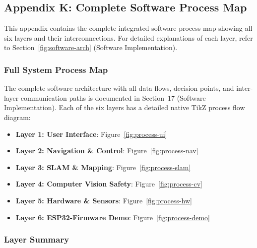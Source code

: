 
\newpage
\subsection{Appendix K: Complete Software Process Map}
\label{app:software-process-full}

This appendix contains the complete integrated software process map showing all six layers and their interconnections. For detailed explanations of each layer, refer to Section~\ref{fig:software-arch} (Software Implementation).

\subsubsection{Full System Process Map}

The complete software architecture with all data flows, decision points, and inter-layer communication paths is documented in Section~17 (Software Implementation). Each of the six layers has a detailed native TikZ process flow diagram:

\begin{itemize}[nosep]
    \item \textbf{Layer 1: User Interface}: Figure~\ref{fig:process-ui}
    \item \textbf{Layer 2: Navigation \& Control}: Figure~\ref{fig:process-nav}
    \item \textbf{Layer 3: SLAM \& Mapping}: Figure~\ref{fig:process-slam}
    \item \textbf{Layer 4: Computer Vision Safety}: Figure~\ref{fig:process-cv}
    \item \textbf{Layer 5: Hardware \& Sensors}: Figure~\ref{fig:process-hw}
    \item \textbf{Layer 6: ESP32-Firmware Demo}: Figure~\ref{fig:process-demo}
\end{itemize}

\subsubsection{Layer Summary}

